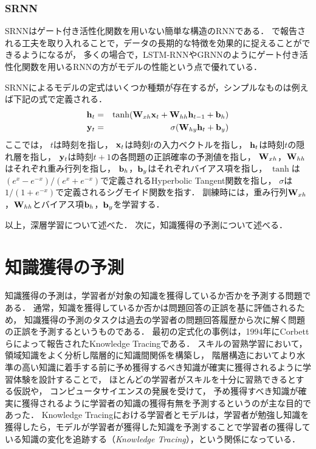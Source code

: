 






\subsubsection{SRNN}
SRNNはゲート付き活性化関数を用いない簡単な構造のRNNである．
\cite{le2015simple, krueger2015regularizing}で報告される工夫を取り入れることで，データの長期的な特徴を効果的に捉えることができるようになるが，
多くの場合で，LSTM-RNNやGRNNのようにゲート付き活性化関数を用いるRNNの方がモデルの性能という点で優れている．

SRNNによるモデルの定式はいくつか種類が存在するが，シンプルなものは例えば下記の式で定義される．
\begin{eqnarray}
\label{eq:srnn1}
{\bf h}_t &=& \tanh({\bf W}_{xh} {\bf x}_t + {\bf W}_{hh}  {\bf h}_{t-1} + {\bf b}_h)\\
\label{eq:srnn2}
{\bf y}_t &=& \sigma( {\bf W}_{hy} {\bf h}_t + {\bf b}_y)
\end{eqnarray}
ここでは，
$t$は時刻を指し，
${\bf x}_t$は時刻$t$の入力ベクトルを指し，
${\bf h}_t$は時刻$t$の隠れ層を指し，
${\bf y}_t$は時刻$t+1$の各問題の正誤確率の予測値を指し，
${\bf W}_{xh}$，${\bf W}_{hh}$はそれぞれ重み行列を指し，
${\bf b}_h$，${\bf b}_y$はそれぞれバイアス項を指し，
$\tanh$は$( e^x - e^{-x} )/( e^x + e^{-x} )$で定義されるHyperbolic Tangent関数を指し，
$\sigma$は$1 / (1 + e^{-x})$で定義されるシグモイド関数を指す．
訓練時には，重み行列${\bf W}_{xh}$，${\bf W}_{hh}$とバイアス項${\bf b}_h$，${\bf b}_y$を学習する．



\vvspace
以上，深層学習について述べた．
次に，知識獲得の予測について述べる．





\section{知識獲得の予測}
知識獲得の予測は，学習者が対象の知識を獲得しているか否かを予測する問題である．
通常，知識を獲得しているか否かは問題回答の正誤を基に評価されるため，
知識獲得の予測のタスクは過去の学習者の問題回答履歴から次に解く問題の正誤を予測するというものである．
最初の定式化の事例は，1994年にCorbettらによって報告されたKnowledge Tracing\cite{corbett1994knowledge}である．
スキルの習熟学習において，
領域知識をよく分析し階層的に知識間関係を構築し，
階層構造においてより水準の高い知識に着手する前に予め獲得するべき知識が確実に獲得されるように学習体験を設計することで，
ほとんどの学習者がスキルを十分に習熟できるとする仮説\cite{keller1968good, bloom1968learning}や，
コンピュータサイエンスの発展を受けて，
予め獲得すべき知識が確実に獲得されるように学習者の知識の獲得有無を予測するというのが主な目的であった．
Knowledge Tracingにおける学習者とモデルは，学習者が勉強し知識を獲得したら，モデルが学習者が獲得した知識を予測することで学習者の獲得している知識の変化を追跡する（{\it Knowledge Tracing}），という関係になっている．


